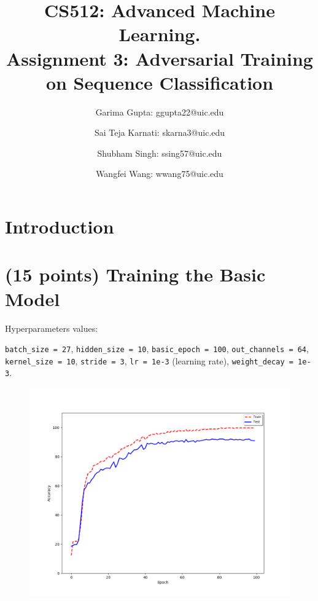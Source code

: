 \documentclass[11pt]{report}
\begin{document}
\title{
  CS512: Advanced Machine Learning. \\
  \large Assignment 3: Adversarial Training on Sequence Classification}

\author{Garima Gupta: ggupta22@uic.edu \and Sai Teja Karnati: skarna3@uic.edu \and
 Shubham Singh: ssing57@uic.edu \and Wangfei Wang: wwang75@uic.edu}

\graphicspath{{../../Figures/}}

\maketitle

\section{Introduction}
\section{(15 points) Training the Basic Model}

Hyperparameters values: 

\texttt{batch\_size = 27}, \texttt{hidden\_size = 10}, \texttt{basic\_epoch = 100}, \texttt{out\_channels = 64}, \texttt{kernel\_size = 10},  \texttt{stride = 3}, \texttt{lr = 1e-3} (learning rate), \texttt{weight\_decay = 1e-3}. 

\begin{figure}[h]
    \includegraphics[width = 15 cm]{BasicModel.png}
    \centering
\end{figure}
\end{document}
